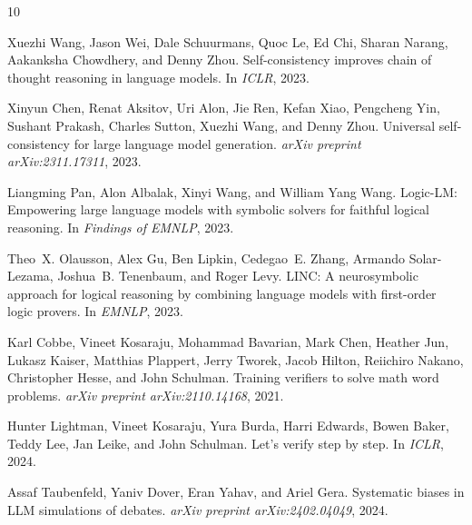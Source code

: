 \documentclass[11pt,a4paper]{article}
\begin{document}
\begingroup
\renewcommand{\section}[2]{}
\begin{thebibliography}{10}

Xuezhi Wang, Jason Wei, Dale Schuurmans, Quoc Le, Ed Chi, Sharan Narang, Aakanksha Chowdhery, and Denny Zhou.
\newblock Self-consistency improves chain of thought reasoning in language models.
\newblock In \emph{ICLR}, 2023.

Xinyun Chen, Renat Aksitov, Uri Alon, Jie Ren, Kefan Xiao, Pengcheng Yin, Sushant Prakash, Charles Sutton, Xuezhi Wang, and Denny Zhou.
\newblock Universal self-consistency for large language model generation.
\newblock \emph{arXiv preprint arXiv:2311.17311}, 2023.

Liangming Pan, Alon Albalak, Xinyi Wang, and William Yang Wang.
\newblock Logic-LM: Empowering large language models with symbolic solvers for faithful logical reasoning.
\newblock In \emph{Findings of EMNLP}, 2023.

Theo~X. Olausson, Alex Gu, Ben Lipkin, Cedegao~E. Zhang, Armando Solar-Lezama, Joshua~B. Tenenbaum, and Roger Levy.
\newblock LINC: A neurosymbolic approach for logical reasoning by combining language models with first-order logic provers.
\newblock In \emph{EMNLP}, 2023.

Karl Cobbe, Vineet Kosaraju, Mohammad Bavarian, Mark Chen, Heather Jun, Lukasz Kaiser, Matthias Plappert, Jerry Tworek, Jacob Hilton, Reiichiro Nakano, Christopher Hesse, and John Schulman.
\newblock Training verifiers to solve math word problems.
\newblock \emph{arXiv preprint arXiv:2110.14168}, 2021.

Hunter Lightman, Vineet Kosaraju, Yura Burda, Harri Edwards, Bowen Baker, Teddy Lee, Jan Leike, and John Schulman.
\newblock Let's verify step by step.
\newblock In \emph{ICLR}, 2024.

Assaf Taubenfeld, Yaniv Dover, Eran Yahav, and Ariel Gera.
\newblock Systematic biases in LLM simulations of debates.
\newblock \emph{arXiv preprint arXiv:2402.04049}, 2024.

\end{thebibliography}
\endgroup
\end{document}

